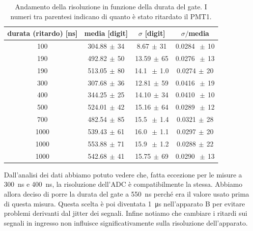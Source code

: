 \begin{table}[h]
\centering
\begin{tabular}{c|c|c|c}
durata (ritardo) [ns] & media [digit] & $\sigma$ [digit] & $\sigma\!/$\!media\\
\hline
 100 & 304.88$\,\pm\,$34 &  8.67$\,\pm\,$31 & 0.0284 $\,\pm\,$10 \\  
 190 & 492.82$\,\pm\,$50 & 13.59$\,\pm\,$65 & 0.0276 $\,\pm\,$13 \\
 190 & 513.05$\,\pm\,$80 & 14.1 $\,\pm\,$1.0 & 0.0274$\,\pm\,$20 \\
 300 & 307.68$\,\pm\,$36 & 12.81$\,\pm\,$59 & 0.0416 $\,\pm\,$19 \\
 400 & 344.25$\,\pm\,$25 & 14.10$\,\pm\,$34 & 0.0410 $\,\pm\,$10 \\
 500 & 524.01$\,\pm\,$42 & 15.16$\,\pm\,$64 & 0.0289 $\,\pm\,$12 \\
 700 & 482.54$\,\pm\,$85 & 15.5 $\,\pm\,$1.4 & 0.0321$\,\pm\,$28 \\
1000 & 539.43$\,\pm\,$61 & 16.0 $\,\pm\,$1.1 & 0.0297$\,\pm\,$20 \\
1000 & 553.88$\,\pm\,$71 & 15.9 $\,\pm\,$1.2 & 0.0288$\,\pm\,$22 \\
1000 & 542.68$\,\pm\,$41 & 15.75$\,\pm\,$69 & 0.0290 $\,\pm\,$13 
\end{tabular}

\caption{Andamento della risoluzione in funzione della durata del gate. I numeri tra parentesi indicano di quanto è stato ritardato il PMT1.}
\label{tab:gate}
\end{table}

Dall'analisi dei dati abbiamo potuto vedere che, fatta eccezione per le misure a \SI{300}{ns} e \SI{400}{ns}, la risoluzione dell'ADC è compatibilmente la stessa.
Abbiamo allora deciso di porre la durata del gate a \SI{550}{ns} perché era il valore usato prima di questa misura.
Questa scelta è poi diventata \SI{1}{\micro s} nell'apparato B per evitare problemi derivanti dal jitter dei segnali. Infine notiamo che cambiare i ritardi sui segnali in ingresso non influisce significativamente sulla risoluzione dell'apparato.

